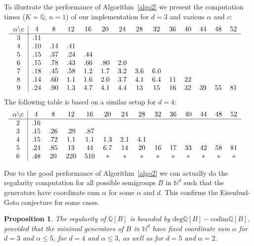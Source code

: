 \documentclass[11pt,a4paper]{amsart}%
\newtheorem{proposition}[theorem]{Proposition}
\theoremstyle{definition}
\theoremstyle{remark}
\numberwithin{equation}{section}
\theoremstyle{plain}
\begin{document}
To illustrate the performance of Algorithm~\ref{algo2} we present the
computation times ($K=\mathbb{Q}$, $n=1$) of our implementation for $d=3$ and
various $\alpha$ and $c$:%
\[%
\begin{tabular}
[c]{c|ccccccccccccc}%
$\alpha\backslash c$ & $4$ & $8$ & $12$ & $16$ & $20$ & $24$ & $28$ & $32$ &
$36$ & $40$ & $44$ & $48$ & $52$\\\hline
$3$ & $.11$ &  &  &  &  &  &  &  &  &  &  &  & \\
$4$ & $.10$ & $.14$ & $.41$ &  &  &  &  &  &  &  &  &  & \\
$5$ & $.15$ & $.37$ & $.24$ & $.44$ &  &  &  &  &  &  &  &  & \\
$6$ & $.15$ & $.78$ & $.43$ & $.66$ & $.80$ & $2.0$ &  &  &  &  &  &  & \\
$7$ & $.18$ & $.45$ & $.58$ & $1.2$ & $1.7$ & $3.2$ & $3.6$ & $6.0$ &  &  &  &
& \\
$8$ & $.14$ & $.60$ & $1.1$ & $1.6$ & $2.0$ & $3.7$ & $4.1$ & $6.4$ & $11$ &
$22$ &  &  & \\
$9$ & $.24$ & $.90$ & $1.3$ & $4.7$ & $4.1$ & $4.4$ & $13$ & $15$ & $16$ &
$32$ & $39$ & $55$ & $81$%
\end{tabular}
\ \ \
\]
The following table is based on a similar setup for $d=4$:%
\[%
\begin{tabular}
[c]{c|ccccccccccccc}%
$\alpha\backslash c$ & $4$ & $8$ & $12$ & $16$ & $20$ & $24$ & $28$ & $32$ &
$36$ & $40$ & $44$ & $48$ & $52$\\\hline
$2$ & $.16$ &  &  &  &  &  &  &  &  &  &  &  & \\
$3$ & $.15$ & $.26$ & $.29$ & $.87$ &  &  &  &  &  &  &  &  & \\
$4$ & $.15$ & $.72$ & $1.1$ & $1.1$ & $1.3$ & $2.1$ & $4.1$ &  &  &  &  &  &
\\
$5$ & $.24$ & $.85$ & $13$ & $44$ & $6.7$ & $14$ & $20$ & $16$ & $17$ & $33$ &
$42$ & $58$ & $81$\\
$6$ & $.48$ & $20$ & $220$ & $510$ & $\ast$ & $\ast$ & $\ast$ & $\ast$ &
$\ast$ & $\ast$ & $\ast$ & $\ast$ & $\ast$%
\end{tabular}
\ \ \
\]


Due to the good performance of Algorithm~\ref{algo2} we can actually do the
regularity computation for all possible semigroups $B$ in $\mathbb{N}^{d}$
such that the generators have coordinate sum $\alpha$ for some $\alpha$ and
$d$. This confirms the Eisenbud-Goto conjecture for some cases.

\begin{proposition}
\label{testegbis5} The regularity of $\mathbb{Q}[B]$ is bounded by
$\mathrm{deg}\mathbb{Q}[B]-\mathrm{codim}\mathbb{Q}[B]$, provided that the
minimal generators of $B$ in $\mathbb{N}^{d}$ have fixed coordinate sum
$\alpha$ for $d=3$ and $\alpha\leq5$, for $d=4$ and $\alpha\leq3$, as well as
for $d=5$ and $\alpha=2$.
\end{proposition}
\end{document}
